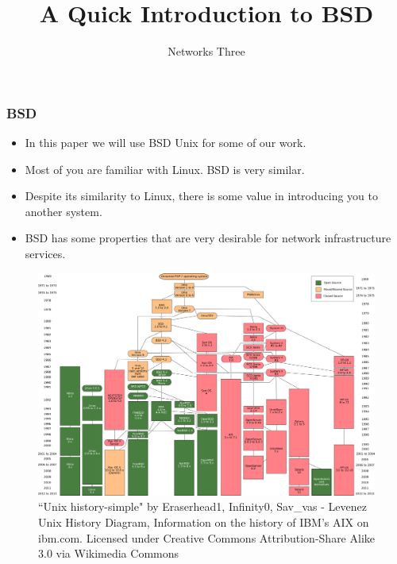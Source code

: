 \documentclass[10pt]{beamer}
\title{A Quick Introduction to BSD}
\author[IN715]{Networks Three}
\institute[Otago Polytechnic]{
  Otago Polytechnic \\
  Dunedin, New Zealand \\
}
\date{}
\begin{document}
\begin{frame}[plain]
  \titlepage
\end{frame}



\begin{frame}
  \frametitle{BSD}
  \begin{itemize}
    \item In this paper we will use BSD Unix for some of our work.
    \item Most of you are familiar with Linux.  BSD is very similar.
    \item Despite its similarity to Linux, there is some value in 
          introducing you to another system.
    \item BSD has some properties that are very desirable for 
          network infrastructure services.
  \end{itemize}  
\end{frame}

\begin{frame}
    \begin{figure}[h!]
    \includegraphics[scale=0.15]{unix-history.png}

\caption{``Unix history-simple" by Eraserhead1, Infinity0, Sav\_vas - Levenez Unix History Diagram, Information on the history of IBM's AIX on ibm.com. Licensed under Creative Commons Attribution-Share Alike 3.0 via Wikimedia Commons}
    \end{figure}
\end{frame}
\end{document}
